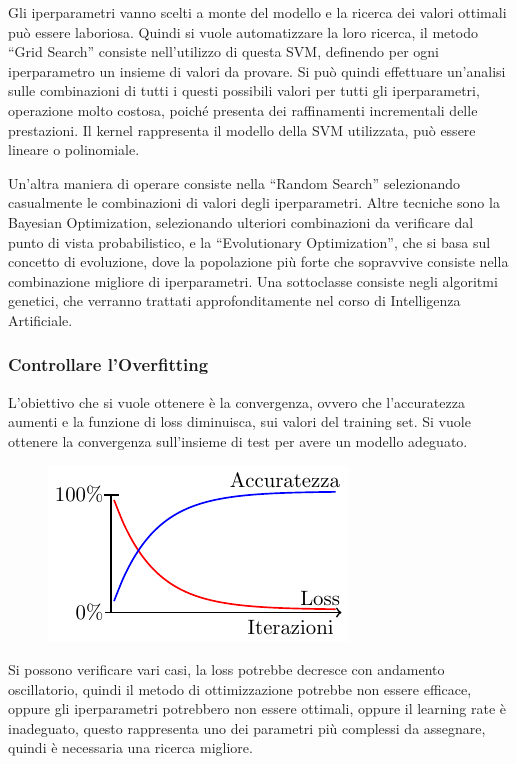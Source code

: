 \documentclass{article}
\numberwithin{equation}{subsection}
\begin{document}
Gli iperparametri vanno scelti a monte del modello e la ricerca dei valori ottimali può essere laboriosa. Quindi si vuole automatizzare la loro ricerca, il metodo ``Grid Search'' 
consiste nell'utilizzo di questa SVM, definendo per ogni iperparametro un insieme di valori da provare. Si può quindi effettuare un'analisi sulle combinazioni di tutti i questi possibili valori per tutti gli iperparametri, operazione molto costosa, poiché presenta dei raffinamenti incrementali delle prestazioni. 
Il kernel rappresenta il modello della SVM utilizzata, può essere lineare o polinomiale. 

Un'altra maniera di operare consiste nella ``Random Search'' selezionando casualmente le 
combinazioni di valori degli iperparametri. 
Altre tecniche sono la Bayesian Optimization, selezionando ulteriori combinazioni da verificare dal punto di vista probabilistico, e la ``Evolutionary Optimization'', che si 
basa sul concetto di evoluzione, dove la popolazione più forte che sopravvive consiste nella combinazione migliore di iperparametri. Una sottoclasse consiste negli algoritmi genetici, che verranno trattati approfonditamente nel corso di Intelligenza Artificiale. 

\subsubsection{Controllare l'Overfitting}

L'obiettivo che si vuole ottenere è la convergenza, ovvero che l'accuratezza aumenti 
e la funzione di loss diminuisca, sui valori del training set. Si vuole ottenere la convergenza sull'insieme di test per avere un modello adeguato. 

\begin{figure}[H]%
    \centering%
    \includegraphics{convergenza.pdf}%
\end{figure}

Si possono verificare vari casi, la loss potrebbe decresce con andamento oscillatorio, quindi il metodo di ottimizzazione potrebbe non essere efficace, oppure gli iperparametri potrebbero non essere ottimali, oppure il learning rate è inadeguato, questo rappresenta uno dei parametri più complessi da assegnare, quindi è necessaria una ricerca migliore. 
\end{document}
